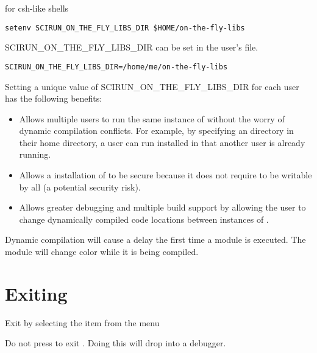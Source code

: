for csh-like shells

\begin{verbatim}
setenv SCIRUN_ON_THE_FLY_LIBS_DIR $HOME/on-the-fly-libs
\end{verbatim}

SCIRUN\_ON\_THE\_FLY\_LIBS\_DIR can be set in the user's
 file.

\begin{verbatim}
SCIRUN_ON_THE_FLY_LIBS_DIR=/home/me/on-the-fly-libs
\end{verbatim}

Setting a unique value of SCIRUN\_ON\_THE\_FLY\_LIBS\_DIR for each
\sr{} user has the following benefits:

\begin{itemize}
\item Allows multiple users to run the same instance of \sr{} without the worry of  dynamic compilation conflicts.
  For example, by specifying an 
  directory in their home directory, a user can run 
  \sr{} installed in  that another user
  is already running.

\item Allows a  installation of \sr{}
  to be secure because it does not require
   to be writable by
  all (a potential security risk).

\item Allows greater debugging and multiple build support by
  allowing the user to change dynamically compiled code locations
  between instances of \sr{}.

\end{itemize}

Dynamic compilation will cause a delay the first time a module is
executed.  The module will change color while it is being
compiled.

\section{Exiting \sr{}}
\label{sec:stopping}

Exit \sr{} by selecting the  item from the  menu

Do not press  to exit \sr{}.  Doing this will drop
\sr{} into a debugger.


